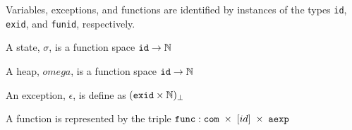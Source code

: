 Variables, exceptions, and functions are identified by instances of the types \verb|id|, \verb|exid|, and \verb|funid|, respectively.

A state, $\sigma$, is a function space $\verb|id| \rightarrow \mathbb{N}$

A heap, $omega$, is a function space $\verb|id| \rightarrow \mathbb{N}$

An exception, $\epsilon$, is define as $(\verb|exid|\times\mathbb{N})_\bot$

A function is represented by the triple $\verb|func|: \verb|com| \; \times \; [id] \; \times \; \verb|aexp|$